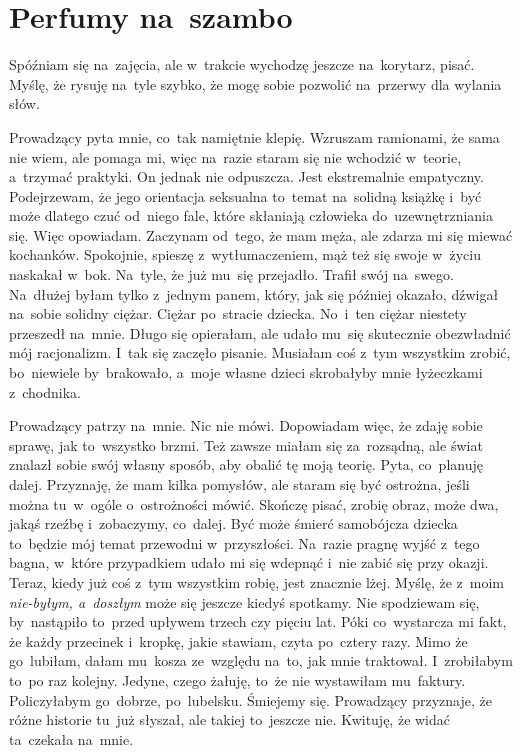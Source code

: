 \documentclass[9pt, a5paper]{memoir}
\begin{document}
\newpage
\section{Perfumy na~szambo}
Spóźniam się na~zajęcia, ale w~trakcie wychodzę jeszcze na~korytarz, pisać. Myślę, że rysuję na~tyle szybko, że mogę sobie pozwolić na~przerwy dla wylania słów.

Prowadzący pyta mnie, co~tak namiętnie klepię. Wzruszam ramionami, że sama nie wiem, ale pomaga mi, więc na~razie staram się nie wchodzić w~teorie, a~trzymać praktyki. On jednak nie odpuszcza. Jest ekstremalnie empatyczny. Podejrzewam, że jego orientacja seksualna to~temat na~solidną książkę i~być może dlatego czuć od~niego fale, które skłaniają człowieka do~uzewnętrzniania się. Więc opowiadam. Zaczynam od~tego, że mam męża, ale zdarza mi się miewać kochanków. Spokojnie, spieszę z~wytłumaczeniem, mąż też się swoje w~życiu naskakał w~bok. Na~tyle, że już mu~się przejadło. Trafił swój na~swego. Na~dłużej byłam tylko z~jednym panem, który, jak się później okazało, dźwigał na~sobie solidny ciężar. Ciężar po~stracie dziecka. No~i~ten ciężar niestety przeszedł na~mnie. Długo się opierałam, ale udało mu~się skutecznie obezwładnić mój racjonalizm. I~tak się zaczęło pisanie. Musiałam coś z~tym wszystkim zrobić, bo~niewiele by~brakowało, a~moje własne dzieci skrobałyby mnie łyżeczkami z~chodnika.

Prowadzący patrzy na~mnie. Nic nie mówi. Dopowiadam więc, że zdaję sobie sprawę, jak to~wszystko brzmi. Też zawsze miałam się za~rozsądną, ale świat znalazł sobie swój własny sposób, aby obalić tę moją teorię. Pyta, co~planuję dalej. Przyznaję, że mam kilka pomysłów, ale staram się być ostrożna, jeśli można tu~w~ogóle o~ostrożności mówić. Skończę pisać, zrobię obraz, może dwa, jakąś rzeźbę i~zobaczymy, co~dalej. Być może śmierć samobójcza dziecka to~będzie mój temat przewodni w~przyszłości. Na~razie pragnę wyjść z~tego bagna, w~które przypadkiem udało mi się wdepnąć i~nie zabić się przy okazji. Teraz, kiedy już coś z~tym wszystkim robię, jest znacznie lżej. Myślę, że z~moim \textit{nie-byłym, a~doszłym} może się jeszcze kiedyś spotkamy. Nie spodziewam się, by~nastąpiło to~przed upływem trzech czy pięciu lat. Póki co~wystarcza mi fakt, że każdy przecinek i~kropkę, jakie stawiam, czyta po~cztery razy. Mimo że go~lubiłam, dałam mu~kosza ze~względu na~to, jak mnie traktował. I~zrobiłabym to~po raz kolejny. Jedyne, czego żałuję, to~że nie wystawiłam mu~faktury. Policzyłabym go~dobrze, po~lubelsku. Śmiejemy się. Prowadzący przyznaje, że różne historie tu~już słyszał, ale takiej to~jeszcze nie. Kwituję, że widać ta~czekała na~mnie.
\end{document}

